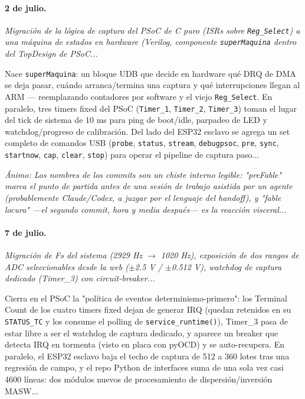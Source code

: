 \paragraph{2 de julio.}
\emph{Migración de la lógica de captura del PSoC de C puro (ISRs sobre \texttt{Reg\_Select}) a una máquina de estados en hardware (Verilog, componente \texttt{superMaquina} dentro del TopDesign de PSoC...}

Nace \texttt{superMaquina}: un bloque UDB que decide en hardware qué DRQ de DMA se deja pasar, cuándo arranca/termina una captura y qué interrupciones llegan al ARM --- reemplazando contadores por software y el viejo \texttt{Reg\_Select}. En paralelo, tres timers fixed del PSoC (\texttt{Timer\_1}, \texttt{Timer\_2}, \texttt{Timer\_3}) toman el lugar del tick de sistema de 10 ms para ping de boot/idle, parpadeo de LED y watchdog/progreso de calibración. Del lado del ESP32 esclavo se agrega un set completo de comandos USB (\texttt{probe}, \texttt{status}, \texttt{stream}, \texttt{debugpsoc}, \texttt{pre}, \texttt{sync}, \texttt{startnow}, \texttt{cap}, \texttt{clear}, \texttt{stop}) para operar el pipeline de captura paso...

{\footnotesize\itshape \'Animo: Los nombres de los commits son un chiste interno legible: "preFable" marca el punto de partida antes de una sesión de trabajo asistida por un agente (probablemente Claude/Codex, a juzgar por el lenguaje del handoff), y "fable locura" ---el segundo commit, hora y media después--- es la reacción visceral...}

\paragraph{7 de julio.}
\emph{Migración de Fs del sistema (2929 Hz $\rightarrow$ 1020 Hz), exposición de dos rangos de ADC seleccionables desde la web ($\pm$2.5 V / $\pm$0.512 V), watchdog de captura dedicado (Timer\_3) con circuit-breaker...}

Cierra en el PSoC la "política de eventos determinismo-primero": los Terminal Count de los cuatro timers fixed dejan de generar IRQ (quedan retenidos en su \texttt{STATUS\_TC} y los consume el polling de \texttt{service\_runtime()}), Timer\_3 pasa de estar libre a ser el watchdog de captura dedicado, y aparece un breaker que detecta IRQ en tormenta (visto en placa con pyOCD) y se auto-recupera. En paralelo, el ESP32 esclavo baja el techo de captura de 512 a 360 lotes tras una regresión de campo, y el repo Python de interfaces suma de una sola vez casi 4600 líneas: dos módulos nuevos de procesamiento de dispersión/inversión MASW...

